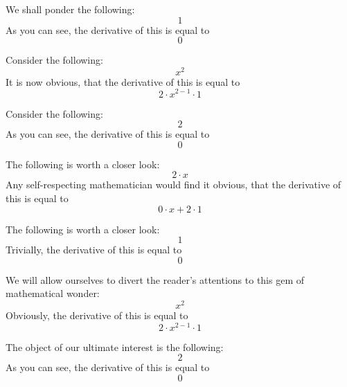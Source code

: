 \documentclass{article}
\begin{document}
We shall ponder the following:
\begin{equation}
1 
\end{equation}
As you can see, the derivative of this is equal to
\begin{equation}
0 
\end{equation}

Consider the following:
\begin{equation}
x ^{2 } 
\end{equation}
It is now obvious, that the derivative of this is equal to
\begin{equation}
2 \cdot x ^{2 - 1 } \cdot 1 
\end{equation}

Consider the following:
\begin{equation}
2 
\end{equation}
As you can see, the derivative of this is equal to
\begin{equation}
0 
\end{equation}

The following is worth a closer look:
\begin{equation}
2 \cdot x 
\end{equation}
Any self-respecting mathematician would find it obvious, that the derivative of this is equal to
\begin{equation}
0 \cdot x + 2 \cdot 1 
\end{equation}

The following is worth a closer look:
\begin{equation}
1 
\end{equation}
Trivially, the derivative of this is equal to
\begin{equation}
0 
\end{equation}

We will allow ourselves to divert the reader's attentions to this gem of mathematical wonder:
\begin{equation}
x ^{2 } 
\end{equation}
Obviously, the derivative of this is equal to
\begin{equation}
2 \cdot x ^{2 - 1 } \cdot 1 
\end{equation}

The object of our ultimate interest is the following:
\begin{equation}
2 
\end{equation}
As you can see, the derivative of this is equal to
\begin{equation}
0 
\end{equation}
\end{document}
